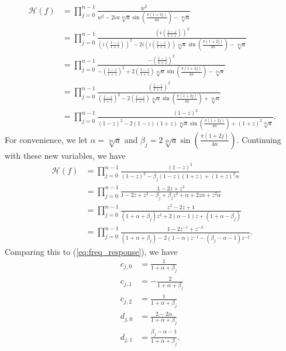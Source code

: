 \documentclass[a4paper]{article}
\begin{document}
\begin{align}
    \mathcal{H}(f) &= \prod_{j=0}^{n - 1}\frac{w^2}
        {w^2 - 2 i w \sqrt[4n]{a} \sin\left(\frac{\pi (1 + 2 j)}{4 n}\right) - \sqrt[2n]{a}} \\
    &= \prod_{j=0}^{n - 1}\frac{\left(i\left(\frac{1 - z}{1 + z}\right)\right)^2}
        {\left(i\left(\frac{1 - z}{1 + z}\right)\right)^2 - 2 i \left(i\left(\frac{1 - z}{1 + z}\right)\right) \sqrt[4n]{a} \sin\left(\frac{\pi (1 + 2 j)}{4 n}\right) - \sqrt[2n]{a}} \\
    &= \prod_{j=0}^{n - 1}\frac{-\left(\frac{1 - z}{1 + z}\right)^2}
        {-\left(\frac{1 - z}{1 + z}\right)^2 + 2 \left(\frac{1 - z}{1 + z}\right) \sqrt[4n]{a} \sin\left(\frac{\pi (1 + 2 j)}{4 n}\right) - \sqrt[2n]{a}} \\
    &= \prod_{j=0}^{n - 1}\frac{\left(\frac{1 - z}{1 + z}\right)^2}
        {\left(\frac{1 - z}{1 + z}\right)^2 - 2 \left(\frac{1 - z}{1 + z}\right) \sqrt[4n]{a} \sin\left(\frac{\pi (1 + 2 j)}{4 n}\right) + \sqrt[2n]{a}} \\
    &= \prod_{j=0}^{n - 1}\frac{(1 - z)^2}
        {(1 - z)^2 - 2 (1 - z)(1 + z) \sqrt[4n]{a} \sin\left(\frac{\pi (1 + 2 j)}{4 n}\right) + (1 + z)^2 \sqrt[2n]{a}}.
\end{align}
For convenience, we let $\alpha = \sqrt[2n]{a}$ and $\beta_j = 2 \sqrt[4n]{a} \sin\left(\frac{\pi (1 + 2 j)}{4 n}\right)$.
Continuing with these new variables, we have
\begin{align}
    \mathcal{H}(f) &= \prod_{j=0}^{n - 1}\frac{(1 - z)^2}
        {(1 - z)^2 - \beta_j (1 - z)(1 + z) + (1 + z)^2 \alpha} \\
    &= \prod_{j=0}^{n - 1}\frac{1 - 2z + z^2}
        {1 - 2z + z^2 - \beta_j + \beta_j z^2 + \alpha + 2z \alpha + z^2 \alpha} \\
    &= \prod_{j=0}^{n - 1}\frac{z^2 - 2z + 1}
        {(1 + \alpha + \beta_j)z^2 + 2(\alpha - 1) z + (1 + \alpha - \beta_j)} \\
        &= \prod_{j=0}^{n - 1}\frac{1 - 2z^{-1} + z^{-2}}
        {(1 + \alpha + \beta_j) - 2(1 - \alpha) z^{-1} - (\beta_j - \alpha - 1)z^{-2}}.
\end{align}
Comparing this to (\ref{eq:freq_response}), we have
\begin{align}
    c_{j,0} &= \frac{1}{1 + \alpha + \beta_j} \\
    c_{j,1} &= -\frac{2}{1 + \alpha + \beta_j} \\
    c_{j,2} &= \frac{1}{1 + \alpha + \beta_j} \\
    d_{j,0} &= \frac{2-2\alpha}{1 + \alpha + \beta_j} \\
    d_{j,1} &= \frac{\beta_j - \alpha - 1}{1 + \alpha + \beta_j}.
\end{align}
\end{document}
